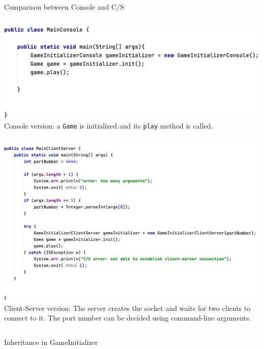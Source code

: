 \documentclass{beamer}
\begin{document}
\begin{frame}{Comparison between Console and C/S}
\begin{columns}
\includegraphics[scale=0.27]{images/mainCo.png}
Console version: a \texttt{Game} is initialized and its \texttt{play} method is called.
\end{columns}
\vspace{0.5cm}
\begin{columns}
\includegraphics[scale=0.21]{images/mainCS.png}
Client-Server version: The server creates the socket and waits for two clients to connect to it. The port number can be decided using command-line arguments.
\end{columns}\end{frame}
\begin{frame}{Inheritance in GameInitializer}

\end{frame}









     
\end{document}

